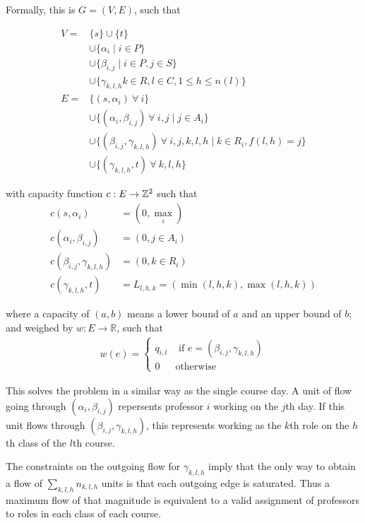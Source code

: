 Formally, this is $G = (V, E)$, such that

\begin{align*}
  V = &\{s\} \cup \{t\}\\
      &\cup \{\alpha_i \mid i \in P\}\\
      &\cup \{\beta_{i, j} \mid i \in P, j \in S\}\\
      &\cup \{\gamma_{k, l, h} k \in R, l \in C, 1 \le h \le n(l)\}\\
  E = &\{(s, \alpha_i)\ \forall\ i\}\\
      &\cup \{(\alpha_i, \beta_{i, j}) \ \forall\ i, j \mid j \in A_i\}\\
      &\cup \{(\beta_{i, j}, \gamma_{k, l, h})\ \forall\ i, j, k, l, h \mid k \in R_i, f(l, h) = j\}\\
      &\cup \{(\gamma_{k, l, h}, t) \ \forall\ k, l, h\}
\end{align*}

with capacity function $c:E \to \mathbb{Z}^2$ such that
\begin{align*}
  c(s, \alpha_i) &= (0, \textstyle\max_i)\\
  c(\alpha_i, \beta_{i, j}) &= (0, j \in A_i)\\
  c(\beta_{i, j}, \gamma_{k, l, h}) &= (0, k \in R_i)\\
  c(\gamma_{k, l, h}, t) &= L_{l, h, k} = (\min(l, h, k), \max(l, h, k))
\end{align*}

where a capacity of $(a, b)$ means a lower bound of $a$ and an upper bound of $b$; and weighed by $w:E \to \mathbb{R}$, such that
\begin{align*}
  w(e) = \begin{cases}
    q_{i, l} & \text{ if } e = (\beta_{i, j}, \gamma_{k, l, h})\\
    0 & \text{otherwise}
  \end{cases}
\end{align*}

This solves the problem in a similar way as the single course day. A unit of flow going through $(\alpha_i, \beta_{i, j})$ repersents professor $i$ working on the $j$th day. If this unit flows through $(\beta_{i, j}, \gamma_{k, l, h})$, this represents working as the $k$th role on the $h$th class of the $l$th course.

The constraints on the outgoing flow for $\gamma_{k, l, h}$ imply that the only way to obtain a flow of $\sum_{k, l, h} n_{k, l, h}$ units is that each outgoing edge is saturated. Thus a maximum flow of that magnitude is equivalent to a valid assignment of professors to roles in each class of each course.

